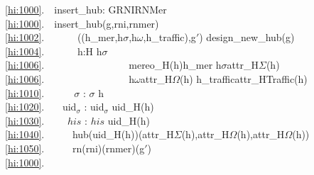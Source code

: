{\mnewfoil


\bp
\ref{hi:1000}.\ \ insert\_hub: G{\TIMES}RNI{\TIMES}RNMer {\RIGHTARROW} \\
\ref{hi:1000}.\ \ insert\_hub(g,rni,rnmer) {\IS}\\
\ref{hi:1002}.\ \ \ \ \ \  ((h\_mer,h$\sigma$,h$\omega$,h\_traffic),g$'$) {\EQ} design\_new\_hub(g)  \\
\ref{hi:1004}.\ \ \ \ \ \  h:H {\RDOT} h{\NOTISIN}$\sigma$ {\RDOT} \\
\ref{hi:1006}.\ \ \ \ \ \ \ \ \ \ \ \ \ \ \ \ \ mereo\_H(h){\EQ}h\_mer {\WEDGE} h$\sigma${\EQ}attr\_H$\Sigma$(h) {\WEDGE} \\
\ref{hi:1006}.\ \ \ \ \ \ \ \ \ \ \ \ \ \ \ \ \ h$\omega${\EQ}attr\_H$\Omega$(h) {\WEDGE} h\_traffic{\EQ}attr\_HTraffic(h) \\
\ref{hi:1010}.\ \ \ \ \ \ $\sigma$ :{\EQ} $\sigma$ {\UNION} {\LBRACE}h{\RBRACE}\\
\ref{hi:1020}.\ \ \ {\PARL} uid$_{\sigma}$ :{\EQ} uid$_{\sigma}$ {\UNION} {\LBRACE}uid\_H(h){\RBRACE}\\
\ref{hi:1030}.\ \ \ \ {\PARL} $his$ :{\EQ} $his$ {\UNION} {\LBRACE}uid\_H(h){\RBRACE}\\
\ref{hi:1040}.\ \ \ \ \ {\PARL} hub(uid\_H(h))(attr\_H$\Sigma$(h),attr\_H$\Omega$(h),attr\_H$\Omega$(h))\\
\ref{hi:1050}.\ \ \ \ \ {\PARL} rn(rni)(rnmer)(g$'$)\\
\ref{hi:1000}.\ \ \ \ \ \  \ \ \dbsquare
\ep
}

\mnewfoil\LLLL\HHHH

